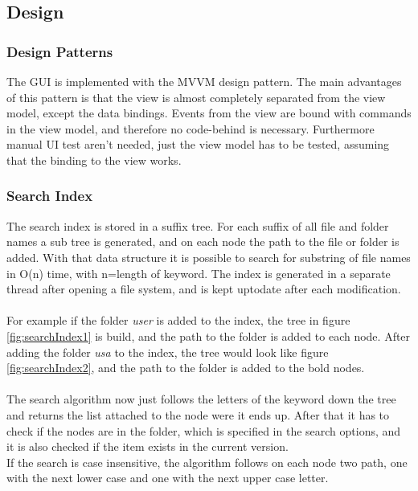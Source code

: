 \documentclass[JCDReport.tex]{subfiles}
\begin{document}
\subsection{Design}

\subsubsection{Design Patterns}
The GUI is implemented with the MVVM design pattern. The main advantages of this pattern is that the view is almost completely separated from the view model, except the data bindings. 
Events from the view are bound with commands in the view model, and therefore no code-behind is necessary. Furthermore manual UI test aren't needed, just the view model has to be tested, assuming that the binding to the view works.

\subsubsection{Search Index}
The search index is stored in a suffix tree. For each suffix of all file and folder names a sub tree is generated, and on each node the path to the file or folder is added. With that data structure it is possible to search for substring of file names in O(n) time, with n=length of keyword. 
The index is generated in a separate thread after opening a file system, and is kept uptodate after each modification. \\
\\
For example if the folder \textit{user} is added to the index, the tree in figure \ref{fig:searchIndex1} is build, and the path to the folder is added to each node.
After adding the folder \textit{usa} to the index, the tree would look like figure \ref{fig:searchIndex2}, and the path to the folder is added to the bold nodes.\\
\\
The search algorithm now just follows the letters of the keyword down the tree and returns the list attached to the node were it ends up. After that it has to check if the nodes are in the folder, which is specified in the search options, and it is also checked if the item exists in the current version.\\
If the search is case insensitive, the algorithm follows on each node two path, one with the next lower case and one with the next upper case letter.
\end{document}
